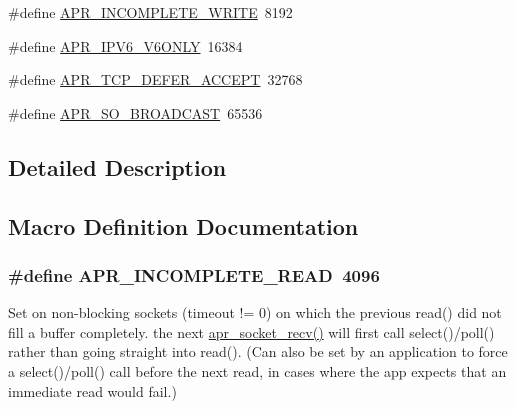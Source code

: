 \begin{DoxyCompactItemize}
\item 
\#define \hyperlink{group__apr__sockopt_ga0c1544983845bf747b4a2a3facfb45e9}{A\+P\+R\+\_\+\+I\+N\+C\+O\+M\+P\+L\+E\+T\+E\+\_\+\+W\+R\+I\+TE}~8192
\item 
\#define \hyperlink{group__apr__sockopt_gae1126f69a19a23c484e3292b016375df}{A\+P\+R\+\_\+\+I\+P\+V6\+\_\+\+V6\+O\+N\+LY}~16384
\item 
\#define \hyperlink{group__apr__sockopt_gaa81adac9b40a87f1d4c0c2f037e9af78}{A\+P\+R\+\_\+\+T\+C\+P\+\_\+\+D\+E\+F\+E\+R\+\_\+\+A\+C\+C\+E\+PT}~32768
\item 
\#define \hyperlink{group__apr__sockopt_ga6d86c537799f60d68d2016563beef15b}{A\+P\+R\+\_\+\+S\+O\+\_\+\+B\+R\+O\+A\+D\+C\+A\+ST}~65536
\end{DoxyCompactItemize}


\subsection{Detailed Description}


\subsection{Macro Definition Documentation}
\subsubsection[{\texorpdfstring{A\+P\+R\+\_\+\+I\+N\+C\+O\+M\+P\+L\+E\+T\+E\+\_\+\+R\+E\+AD}{APR_INCOMPLETE_READ}}]{\setlength{\rightskip}{0pt plus 5cm}\#define A\+P\+R\+\_\+\+I\+N\+C\+O\+M\+P\+L\+E\+T\+E\+\_\+\+R\+E\+AD~4096}\hypertarget{group__apr__sockopt_ga73b6c80791c5148c2a416e03a8a1ff8a}{}\label{group__apr__sockopt_ga73b6c80791c5148c2a416e03a8a1ff8a}
Set on non-\/blocking sockets (timeout != 0) on which the previous read() did not fill a buffer completely. the next \hyperlink{group__apr__network__io_gaa6ee00191f197f64b5a5409f4aff53d1}{apr\+\_\+socket\+\_\+recv()} will first call select()/poll() rather than going straight into read(). (Can also be set by an application to force a select()/poll() call before the next read, in cases where the app expects that an immediate read would fail.) 
